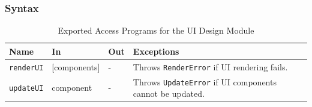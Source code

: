 \documentclass[12pt, titlepage]{article}
\begin{document}
\subsubsection{Syntax}
\begin{description}
  \item[Exported Constants and Access Programs:]
  \item
  \begin{table}[h!]
    \centering
    \begin{tabular}{p{} p{} p{} p{}}
    \toprule
    \textbf{Name} & \textbf{In} & \textbf{Out} & \textbf{Exceptions}\\
    \midrule
    \texttt{renderUI} & [components] & - & Throws \texttt{RenderError} if UI rendering fails.\\
    \midrule
    \texttt{updateUI} & component & - & Throws \texttt{UpdateError} if UI components cannot be updated.\\
    \bottomrule
    \end{tabular}
    \caption{Exported Access Programs for the UI Design Module}
    \label{TblEAP_UI}
  \end{table}
\end{description}
\end{document}
